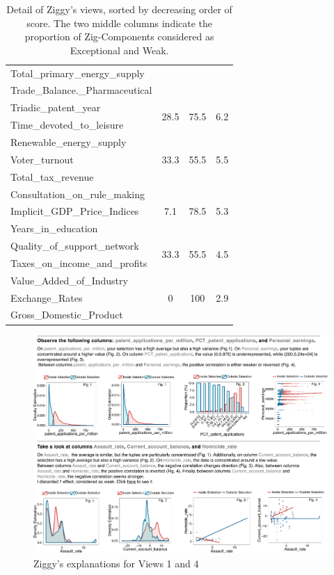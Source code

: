 \begin{table}[!t]
\begin{tabular}{p{4cm} c c c}
        Total\_primary\_energy\_supply&&&\\ 
        Trade\_Balance.\_Pharmaceutical&&&\\ 
        \hline
        Triadic\_patent\_year&
        \multirow{2}{*}{28.5} &\multirow{2}{*}{75.5} & \multirow{2}{*}{6.2} \\
        Time\_devoted\_to\_leisure&&&\\ 
        \hline
        Renewable\_energy\_supply&
        \multirow{3}{*}{33.3} &\multirow{3}{*}{55.5} & \multirow{3}{*}{5.5} \\
        Voter\_turnout&&&\\ 
        Total\_tax\_revenue&&&\\ 
        \hline
        Consultation\_on\_rule\_making&
        \multirow{3}{*}{7.1} &\multirow{3}{*}{78.5} & \multirow{3}{*}{5.3} \\
        Implicit\_GDP\_Price\_Indices&&&\\
        Years\_in\_education&&&\\
        \hline
        Quality\_of\_support\_network&
        \multirow{2}{*}{33.3} &\multirow{2}{*}{55.5} & \multirow{2}{*}{4.5} \\
        Taxes\_on\_income\_and\_profits&&&\\
        \hline
        Value\_Added\_of\_Industry&
        \multirow{3}{*}{0} &\multirow{3}{*}{100} & \multirow{3}{*}{2.9} \\
        Exchange\_Rates&&&\\
        Gross\_Domestic\_Product&&&\\
        \hline
    \end{tabular}
    \caption{Detail of Ziggy's views, sorted by decreasing order of score. The
    two middle columns indicate the proportion of Zig-Components considered as
Exceptional and Weak.}
    \label{tab:ziggysviews}
\end{table}
\begin{figure}[!ht]
  \centering
  \includegraphics[width=2\columnwidth]{Figures/UseCase}
  \caption{Ziggy's explanations for Views 1 and 4}
  \label{pic:zigdetail}
\end{figure}

